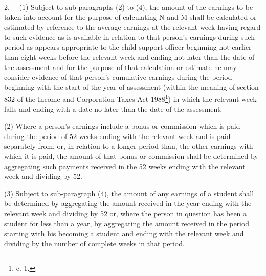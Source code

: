 \documentclass[a4paper]{article}
\begin{document}
2.—%
%
%
%
(1) Subject to sub-paragraphs (2) to (4), the amount of the earnings to be taken into account for the purpose of calculating N and M shall be calculated or estimated by reference to the average earnings at the relevant week having regard to such evidence as is available in relation to that person’s earnings during such period as appears appropriate to the child support officer beginning not earlier than eight weeks before the relevant week and ending not later than the date of the assessment and for the purpose of that calculation or estimate he may consider evidence of that person’s cumulative earnings during the period beginning with the start of the year of assessment (within the meaning of section 832 of the Income and Corporation Taxes Act 1988\footnote{ c. 1.}) in which the relevant week falls and ending with a date no later than the date of the assessment.

(2) Where a person’s earnings include a bonus or commission which is paid during the period of 52 weeks ending with the relevant week and is paid separately from, or, in relation to a longer period than, the other earnings with which it is paid, the amount of that bonus or commission shall be determined by aggregating such payments received in the 52 weeks ending with the relevant week and dividing by 52.

(3) Subject to sub-paragraph (4), the amount of any earnings of a student shall be determined by aggregating the amount received in the year ending with the relevant week and dividing by 52 or, where the person in question has been a student for less than a year, by aggregating the amount received in the period starting with his becoming a student and ending with the relevant week and dividing by the number of complete weeks in that period.
\end{document}
